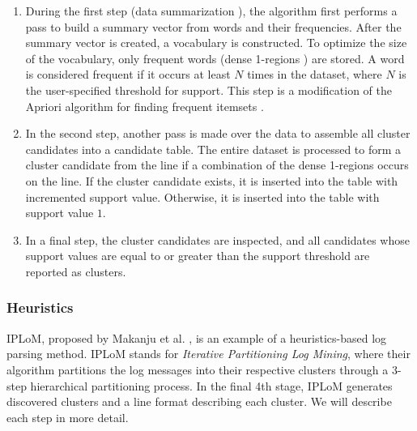     \begin{enumerate} 
        \item During the first step (data summarization ), the algorithm first performs a pass to build a summary vector from words and their frequencies. After the summary vector is created, a vocabulary is constructed. To optimize the size of the vocabulary, only frequent words (dense 1-regions ) are stored. A word is considered frequent if it occurs at least $N$ times in the dataset, where $N$ is the user-specified threshold for support. This step is a modification of the Apriori algorithm for finding frequent itemsets \cite{Agrawal94fastalgorithms}. 
        
        \item In the second step, another pass is made over the data to assemble all cluster candidates into a candidate table. The entire dataset is processed to form a cluster candidate from the line if a combination of the dense 1-regions occurs on the line. If the cluster candidate exists, it is inserted into the table with incremented support value. Otherwise, it is inserted into the table with support value $1$. 
        
        \item In a final step, the cluster candidates are inspected, and all candidates whose support values are equal to or greater than the support threshold are reported as clusters.
    \end{enumerate}

    
\subsubsection*{Heuristics}
IPLoM, proposed by Makanju et al. \cite{Makanju2009ALA}, is an example of a heuristics-based log parsing method. IPLoM stands for \textit{Iterative Partitioning Log Mining}, where their algorithm partitions the log messages into their respective clusters through a 3-step hierarchical partitioning process. In the final 4th stage, IPLoM generates discovered clusters and a line format describing each cluster. We will describe each step in more detail.\\

